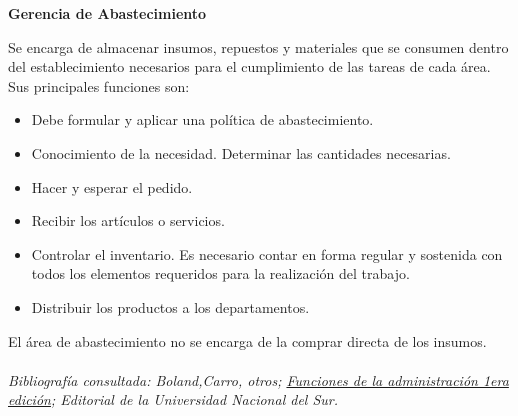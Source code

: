 \documentclass[a4paper,10pt,titlepage]{article}
\begin{document}
\begin{enumerate}
\textbf{Gerencia de Abastecimiento}

	\indent Se encarga de almacenar insumos, repuestos y materiales que se consumen dentro del establecimiento necesarios para el cumplimiento de las tareas de cada \'area. Sus principales funciones son: 
		\begin{itemize}
		\item Debe formular y aplicar una política de abastecimiento.
		\item Conocimiento de la necesidad. Determinar las cantidades necesarias.
		\item Hacer y esperar el pedido.
		\item Recibir los art\'iculos o servicios.
		\item Controlar el inventario. Es necesario contar en forma regular y sostenida con todos los elementos requeridos para la realizaci\'on del trabajo.
		\item Distribuir los productos a los departamentos.
		\end{itemize}
	\indent El \'area de abastecimiento no se encarga de la comprar directa de los insumos.\\\\
	
	\indent \textit{Bibliografía consultada: Boland,Carro, otros; \underline{Funciones de la administración 1era edición}; Editorial de la Universidad Nacional del Sur.}\\


\end{enumerate}
\end{document}
